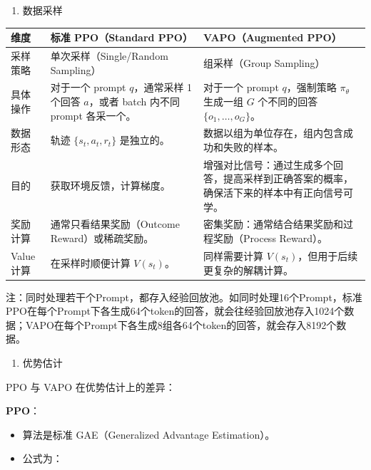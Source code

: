 \begin{enumerate}
\def\labelenumi{\arabic{enumi}.}
\setcounter{enumi}{1}
\tightlist
\item
  数据采样
\end{enumerate}

\begin{longtable}[]{@{}
  >{\raggedright\arraybackslash}p{}
  >{\raggedright\arraybackslash}p{}
  >{\raggedright\arraybackslash}p{}@{}}
\toprule
维度 & 标准 PPO（Standard PPO） & VAPO（Augmented PPO） \\
\midrule
\endhead
采样策略 & 单次采样（Single/Random Sampling） & 组采样（Group Sampling） \\
具体操作 & 对于一个 prompt \(q\)，通常采样 1 个回答 \(a\)，或者 batch 内不同 prompt 各采一个。 & 对于一个 prompt \(q\)，强制策略 \(\pi_\theta\) 生成一组 \(G\) 个不同的回答 \(\{o_1,\ldots,o_G\}\)。 \\
数据形态 & 轨迹 \(\{s_t,a_t,r_t\}\) 是独立的。 & 数据以组为单位存在，组内包含成功和失败的样本。 \\
目的 & 获取环境反馈，计算梯度。 & 增强对比信号：通过生成多个回答，提高采样到正确答案的概率，确保活下来的样本中有正向信号可学。 \\
奖励计算 & 通常只看结果奖励（Outcome Reward）或稀疏奖励。 & 密集奖励：通常结合结果奖励和过程奖励（Process Reward）。 \\
Value 计算 & 在采样时顺便计算 \(V(s_t)\)。 & 同样需要计算 \(V(s_t)\)，但用于后续更复杂的解耦计算。 \\
\bottomrule
\end{longtable}

注：同时处理若干个Prompt，都存入经验回放池。如同时处理16个Prompt，标准PPO在每个Prompt下各生成64个token的回答，就会往经验回放池存入1024个数据；VAPO在每个Prompt下各生成8组各64个token的回答，就会存入8192个数据。

\begin{enumerate}
\def\labelenumi{\arabic{enumi}.}
\setcounter{enumi}{2}
\tightlist
\item
  优势估计
\end{enumerate}

PPO 与 VAPO 在优势估计上的差异：

\textbf{PPO}：

\begin{itemize}
\tightlist
\item
  算法是标准 GAE（Generalized Advantage Estimation）。
\item
{}
  公式为：
\end{itemize}

